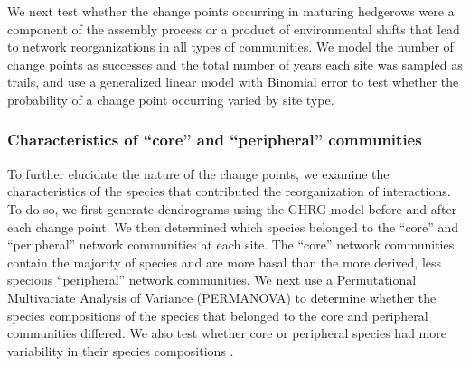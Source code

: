 \documentclass[12pt]{article}
\begin{document}
We next test whether the change points occurring in maturing hedgerows
were a component of the assembly process or a product of environmental
shifts that lead to network reorganizations in all types of
communities. We model the number of change points as successes and the
total number of years each site was sampled as trails, and use a
generalized linear model with Binomial error to test whether the
probability of a change point occurring varied by site type.

\subsubsection*{Characteristics of ``core'' and ``peripheral'' communities}
To further elucidate the nature of the change points, we examine the
characteristics of the species that contributed the reorganization of
interactions. To do so, we first generate dendrograms using the GHRG
model before and after each change point.  We then determined which
species belonged to the ``core'' and ``peripheral'' network
communities at each site. The ``core'' network communities contain the
majority of species and are more basal than the more derived, less
specious ``peripheral'' network communities. We next use a
Permutational Multivariate Analysis of Variance (PERMANOVA)
\citep{anderson-2013-557} to determine whether the species
compositions of the species that belonged to the core and peripheral
communities differed. We also test whether core or peripheral species
had more variability in their species compositions \citep[i.e.,
multivariate dispersion, ][]{anderson-2011-19,
  anderson-2006-683}. 

\end{document}
